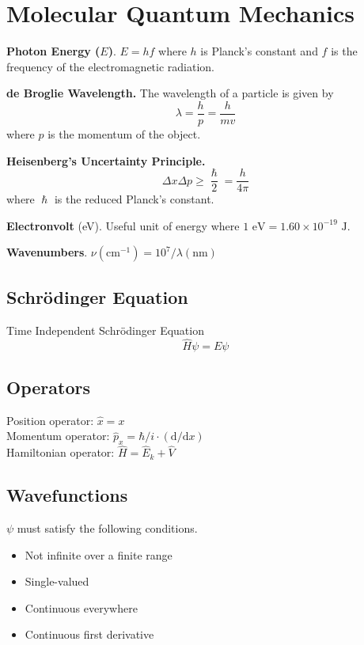 
\section{Molecular Quantum Mechanics}

\textbf{Photon Energy ($E$)}. $E = hf$ where
$h$ is Planck's constant and $f$ is the frequency of the electromagnetic
radiation.
\vspace{\baselineskip}

\textbf{de Broglie Wavelength.} The wavelength of a particle is given by
\begin{equation*} \lambda = \frac{h}{p} = \frac{h}{mv} \end{equation*} where $p$
is the momentum of the object.
\vspace{\baselineskip}

\textbf{Heisenberg's Uncertainty Principle.} \begin{equation*} \Delta x \Delta p \geq \frac{\hslash}{2} =
  \frac{h}{4\pi} \end{equation*} where $\hslash$ is the reduced Planck's constant.
\vspace{\baselineskip}

\textbf{Electronvolt} (eV). Useful unit of energy where $1 \textrm{ eV} = 1.60 \times 10^{-19} \textrm{ J}$.
\vspace{\baselineskip}

\textbf{Wavenumbers}. $\nu(\mathrm{cm}^{-1}) = 10^7 / \lambda (\mathrm{nm})$
\vspace{\baselineskip}

\subsection*{Schrödinger Equation}
Time Independent Schrödinger Equation
\begin{equation*}
    \hat{H}\psi = E\psi
\end{equation*}

\subsection*{Operators}
Position operator: $\hat{x} = x$ \\
Momentum operator: $\hat{p}_x = \hbar/i \cdot (\mathrm{d}/\mathrm{d}x)$ \\
Hamiltonian operator: $\hat{H} = \hat{E}_k + \hat{V}$
\vspace{\baselineskip}

\subsection*{Wavefunctions}
$\psi$ must satisfy the following conditions.
\begin{itemize}
    \item Not infinite over a finite range
    \item Single-valued
    \item Continuous everywhere
    \item Continuous first derivative
\end{itemize}

